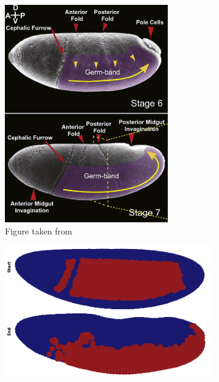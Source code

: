 \begin{figure}[H]
    \centering
    \begin{subfigure}[b]{0.34\textwidth}
        \includegraphics[width=\textwidth]{chapters/Results/figures/compareGB.png}
    \caption{Figure taken from  }
    \end{subfigure}
     \hfill
    \begin{subfigure}[b]{0.61\textwidth}
    \includegraphics[width=\textwidth]{chapters/Results/figures/gb_firstframe_lastframe.png}

\end{subfigure}
\end{figure}
